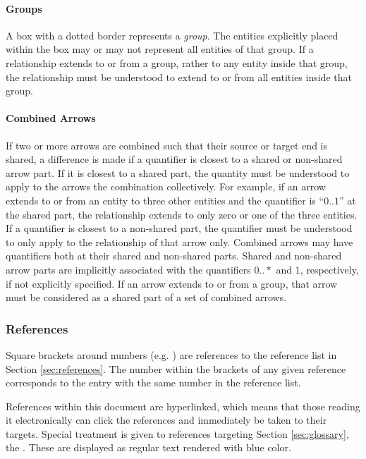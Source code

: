 \paragraph{Groups}
A box with a dotted border represents a \textit{group}.
The entities explicitly placed within the box may or may not represent all entities of that group.
If a relationship extends to or from a group, rather to any entity inside that group, the relationship must be understood to extend to or from all entities inside that group.

\paragraph{Combined Arrows}
If two or more arrows are combined such that their source or target end is shared, a difference is made if a quantifier is closest to a shared or non-shared arrow part.
If it is closest to a shared part, the quantity must be understood to apply to the arrows the combination collectively.
For example, if an arrow extends to or from an entity to three other entities and the quantifier is ``$0..1$'' at the shared part, the relationship extends to only zero or one of the three entities.
If a quantifier is closest to a non-shared part, the quantifier must be understood to only apply to the relationship of that arrow only.
Combined arrows may have quantifiers both at their shared and non-shared parts.
Shared and non-shared arrow parts are implicitly associated with the quantifiers $0..*$ and $1$, respectively, if not explicitly specified.
If an arrow extends to or from a group, that arrow must be considered as a shared part of a set of combined arrows.

\subsubsection{References}

Square brackets around numbers (e.g. \cite{delsing2017iot}) are references to the reference list in Section \ref{sec:references}.
The number within the brackets of any given reference corresponds to the entry with the same number in the reference list.

References within this document are hyperlinked, which means that those reading it electronically can click the references and immediately be taken to their targets.
Special treatment is given to references targeting Section \ref{sec:glossary}, the .
These are displayed as regular text rendered with blue color.

